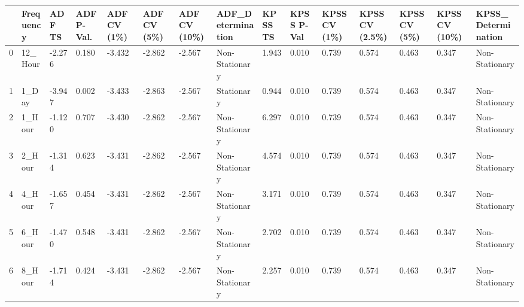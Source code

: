 \begin{tabular}{lllllllllllllll}
\toprule
 & Frequency & ADF TS & ADF P-Val. & ADF CV (1\%) & ADF CV (5\%) & ADF CV (10\%) & ADF_Determination & KPSS TS & KPSS P-Val & KPSS CV (1\%) & KPSS CV (2.5\%) & KPSS CV (5\%) & KPSS CV (10\%) & KPSS_Determination \\
\midrule
0 & 12_Hour & -2.276 & 0.180 & -3.432 & -2.862 & -2.567 & Non-Stationary & 1.943 & 0.010 & 0.739 & 0.574 & 0.463 & 0.347 & Non-Stationary \\
1 & 1_Day & -3.947 & 0.002 & -3.433 & -2.863 & -2.567 & Stationary & 0.944 & 0.010 & 0.739 & 0.574 & 0.463 & 0.347 & Non-Stationary \\
2 & 1_Hour & -1.120 & 0.707 & -3.430 & -2.862 & -2.567 & Non-Stationary & 6.297 & 0.010 & 0.739 & 0.574 & 0.463 & 0.347 & Non-Stationary \\
3 & 2_Hour & -1.314 & 0.623 & -3.431 & -2.862 & -2.567 & Non-Stationary & 4.574 & 0.010 & 0.739 & 0.574 & 0.463 & 0.347 & Non-Stationary \\
4 & 4_Hour & -1.657 & 0.454 & -3.431 & -2.862 & -2.567 & Non-Stationary & 3.171 & 0.010 & 0.739 & 0.574 & 0.463 & 0.347 & Non-Stationary \\
5 & 6_Hour & -1.470 & 0.548 & -3.431 & -2.862 & -2.567 & Non-Stationary & 2.702 & 0.010 & 0.739 & 0.574 & 0.463 & 0.347 & Non-Stationary \\
6 & 8_Hour & -1.714 & 0.424 & -3.431 & -2.862 & -2.567 & Non-Stationary & 2.257 & 0.010 & 0.739 & 0.574 & 0.463 & 0.347 & Non-Stationary \\
\bottomrule
\end{tabular}
